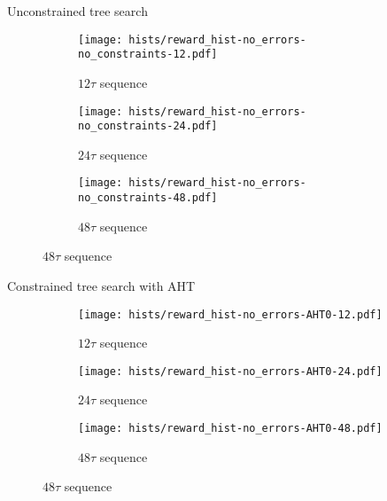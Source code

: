\documentclass{beamer}
\begin{document}
\begin{frame}{Unconstrained tree search}
%
\begin{figure}[H]
    \centering
    \begin{subfigure}{.49\textwidth}
        \centering
        \texttt{[image: hists/reward\_hist-no\_errors-no\_constraints-12.pdf]}
        \caption{$12\tau$ sequence}
        \label{fig:reward_hist-no_errors-no_constraints-12}
    \end{subfigure}
    \begin{subfigure}{.49\textwidth}
        \centering
        \texttt{[image: hists/reward\_hist-no\_errors-no\_constraints-24.pdf]}
        \caption{$24\tau$ sequence}
        \label{fig:reward_hist-no_errors-no_constraints-24}
    \end{subfigure}
    \begin{subfigure}{.49\textwidth}
        \centering
        \texttt{[image: hists/reward\_hist-no\_errors-no\_constraints-48.pdf]}
        \caption{$48\tau$ sequence}
        \label{fig:reward_hist-no_errors-no_constraints-48}
    \end{subfigure}
\end{figure}


\end{frame}





\begin{frame}{Constrained tree search with AHT}
%
\begin{figure}[H]
    \centering
    \begin{subfigure}{.49\textwidth}
        \centering
        \texttt{[image: hists/reward\_hist-no\_errors-AHT0-12.pdf]}
        \caption{$12\tau$ sequence}
        \label{fig:reward_hist-no_errors-AHT0-12}
    \end{subfigure}
    \begin{subfigure}{.49\textwidth}
        \centering
        \texttt{[image: hists/reward\_hist-no\_errors-AHT0-24.pdf]}
        \caption{$24\tau$ sequence}
        \label{fig:reward_hist-no_errors-AHT0-24}
    \end{subfigure}
    \begin{subfigure}{.49\textwidth}
        \centering
        \texttt{[image: hists/reward\_hist-no\_errors-AHT0-48.pdf]}
        \caption{$48\tau$ sequence}
        \label{fig:reward_hist-no_errors-AHT0-48}
    \end{subfigure}
\end{figure}


\end{frame}
\end{document}
